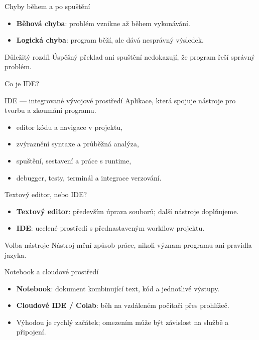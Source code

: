 \documentclass[aspectratio=169]{beamer}
\newcommand{\term}[1]{\textcolor{CodeBlue}{\textbf{#1}}}
\begin{document}
\begin{frame}{Chyby během a po spuštění}
  \begin{itemize}
    \item \term{Běhová chyba}: problém vznikne až během vykonávání.
    \item \term{Logická chyba}: program běží, ale dává nesprávný výsledek.
  \end{itemize}
  \begin{alertblock}{Důležitý rozdíl}
    Úspěšný překlad ani spuštění nedokazují, že program řeší správný problém.
  \end{alertblock}
\end{frame}

\begin{frame}{Co je IDE?}
  \begin{block}{IDE --- integrované vývojové prostředí}
    Aplikace, která spojuje nástroje pro tvorbu a zkoumání programu.
  \end{block}
  \begin{itemize}
    \item editor kódu a navigace v projektu,
    \item zvýraznění syntaxe a průběžná analýza,
    \item spuštění, sestavení a práce s runtime,
    \item debugger, testy, terminál a integrace verzování.
  \end{itemize}
\end{frame}

\begin{frame}{Textový editor, nebo IDE?}
  \begin{itemize}
    \item \term{Textový editor}: především úprava souborů; další nástroje doplňujeme.
    \item \term{IDE}: ucelené prostředí s přednastaveným workflow projektu.
  \end{itemize}
  \begin{block}{Volba nástroje}
    Nástroj mění způsob práce, nikoli význam programu ani pravidla jazyka.
  \end{block}
\end{frame}

\begin{frame}{Notebook a cloudové prostředí}
  \begin{itemize}
    \item \term{Notebook}: dokument kombinující text, kód a jednotlivé výstupy.
    \item \term{Cloudové IDE / Colab}: běh na vzdáleném počítači přes prohlížeč.
    \item Výhodou je rychlý začátek; omezením může být závislost na službě a připojení.
  \end{itemize}
\end{frame}
\end{document}

